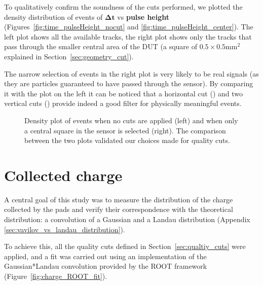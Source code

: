 To qualitatively confirm the soundness of the cuts performed, we plotted the density distribution of events of \(\boldsymbol{\Delta t}\) vs \textbf{pulse height} (Figures~\ref{fig:time_pulseHeight_nocut} and \ref{fig:time_pulseHeight_center}). The left plot shows all the available tracks, the right plot shows only the tracks that pass through the smaller central area of the DUT (a square of \(0.5\times0.5\unit{\milli\meter^2}\) explained in Section~\ref{sec:geometry_cut}).

The narrow selection of events in the right plot is very likely to be real signals (as they are particles guaranteed to have passed through the sensor). By comparing it with the plot on the left it can be noticed that a horizontal cut () and two vertical cuts () provide indeed a good filter for physically meaningful events. 


\begin{figure}[h!tbp]
    \centering
    \hfill
    \centering
    \captionsetup{width=\captionwidth}
        \caption{Density plot of events when no cuts are applied (left) and when only a central square in the sensor is selected (right). The comparison between the two plots validated our choices made for quality cuts.}
\end{figure}


\section{Collected charge}\label{sec:methods_collected_charge}

A central goal of this study was to measure the distribution of the charge collected by the pads and verify their correspondence with the theoretical distribution: a convolution of a Gaussian and a Landau distribution (Appendix \ref{sec:vavilov_vs_landau_distribution}).

To achieve this, all the quality cuts defined in Section~\ref{sec:qualtiy_cuts} were applied, and a fit was carried out using an implementation of the Gaussian*Landau convolution provided by the ROOT framework~\cite{Brun:1997pa} (Figure~\ref{fig:charge_ROOT_fit}).

